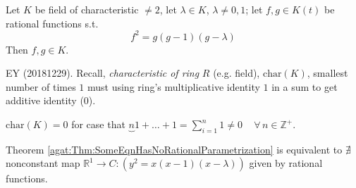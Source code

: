 \begin{theorem}[$y^2 = x(x-1)(x-\lambda)$ has no rational parametrization]\label{agat:Thm:SomeEqnHasNoRationalParametrization}
	Let $K$ be field of characteristic $\neq 2$, let $\lambda \in K$, $\lambda \neq 0, 1$; let $f,g \in K(t)$ be rational functions s.t.\[
	f^2 = g(g-1)(g-\lambda)
	\]
	Then $f, g\in K$. 	
\end{theorem}
	EY (20181229). Recall, \emph{characteristic of ring} $R$ (e.g. field), $\text{char}(K)$, smallest number of times $1$ must using ring's multiplicative identity $1$ in a sum to get additive identity ($0$). 
	
	$\text{char}(K) = 0$ for case that $\underbrace{n}{1 + \dots + 1} = \sum_{i=1}^n 1 \neq 0 \quad \, \forall \, n \in \mathbb{Z}^+$.  

	Theorem \ref{agat:Thm:SomeEqnHasNoRationalParametrization} is equivalent to $\nexists $ nonconstant map $\mathbb{R}^1 \to C : (y^2 = x(x-1)(x-\lambda))$ given by rational functions.
	
